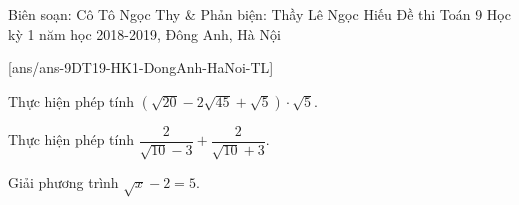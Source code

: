 \begin{name}
{Biên soạn: Cô Tô Ngọc Thy \& Phản biện: Thầy Lê Ngọc Hiếu}
{Đề thi Toán 9 Học kỳ 1 năm học 2018-2019, Đông Anh, Hà Nội }
\end{name}
\setcounter{bt}{0}
[ans/ans-9DT19-HK1-DongAnh-HaNoi-TL]
\begin{bt}%
	Thực hiện phép tính $\left( \sqrt{20}-2\sqrt{45}+\sqrt{5}\right)\cdot\sqrt{5}$.	
\end{bt}

\begin{bt}%
	Thực hiện phép tính $\dfrac{2}{\sqrt{10}-3}+\dfrac{2}{\sqrt{10}+3}$.
	
\end{bt}
\begin{bt}%
	Giải  phương trình $\sqrt{x}-2=5$.
\end{bt}

